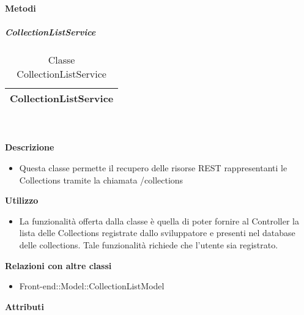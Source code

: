 		\textbf{Metodi} 
	\begin{itemize}
		\end{itemize}
			\subparagraph{CollectionListService} 
\begin{table}[ht]
\begin{center}
\bgroup
	\setlength{\arrayrulewidth}{0.6mm}
	\def\arraystretch{1}
		\begin{tabular}{ | p{12cm} | }
				\hline  
					\centerline{\textbf{CollectionListService}}
		\\ \hline 
				\hline
				\hline
		
		\end{tabular}
\egroup
\caption{Classe CollectionListService}
\end{center}
\end{table}  \textbf{\\ \\ Descrizione} 
					\begin{itemize}
						\item[] Questa classe permette il recupero delle risorse REST rappresentanti le Collections tramite la chiamata /collections
					\end{itemize}      
				\textbf{Utilizzo}  
					\begin{itemize}
						\item[] La funzionalità offerta dalla classe è quella di poter fornire al Controller la lista delle Collections registrate dallo sviluppatore e presenti nel database delle collections.
Tale funzionalità richiede che l'utente sia registrato.
					\end{itemize}
					\textbf{Relazioni con altre classi}
					\begin{itemize}
							\item{Front-end::Model::CollectionListModel}
					\end{itemize}
			 \textbf{Attributi} 
	\begin{itemize}
		\end{itemize}
		
